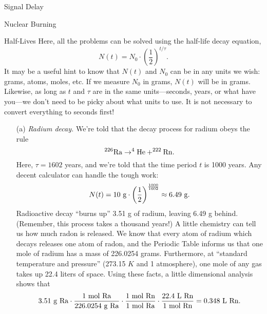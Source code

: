 \documentclass[12pt]{article}
\begin{document}
\begin{probdesc}{5}{Signal Delay}
\end{probdesc}

\begin{probdesc}{6}{Nuclear Burning}
\end{probdesc}

\begin{probdesc}{7}{Half-Lives}
Here, all the problems can be solved using the half-life decay equation,
\begin{equation}
N(t) = N_0 \cdot \left(\frac{1}{2}\right)^{t / \tau}.
\end{equation}
It may be a useful hint to know that $N(t)$ and $N_0$ can be in any
units we wish:  grams, atoms, moles, etc.  If we measure $N_0$ in
grams, $N(t)$ will be in grams.  Likewise, as long as $t$ and $\tau$
are in the same units---seconds, years, or what have you---we don't
need to be picky about what units to use.  It is not necessary to
convert everything to seconds first!

\begin{enumerate}
\item[(a)] {\em Radium decay.}  We're told that the decay process for
  radium obeys the rule
  \begin{equation}
    ^{226}{\rm Ra} \rightarrow ^4{\rm He} + ^{222}{\rm Rn}.
  \end{equation}
  Here, $\tau = 1602$ years, and we're told that the time period $t$
  is 1000 years.  Any decent calculator can handle the tough work:
\begin{equation}
N(t) = 10 {\rm\ g} \cdot \left(\frac{1}{2}\right)^{\frac{1000}{1602}}
  \approx 6.49 {\rm\ g}.
\end{equation}
Radioactive decay ``burns up'' 3.51 g of radium, leaving 6.49 g
behind.  (Remember, this process takes a thousand years!)  A little
chemistry can tell us how much radon is released.  We know that every
atom of radium which decays releases one atom of radon, and the
Periodic Table informs us that one mole of radium has a mass of
226.0254 grams.  Furthermore, at ``standard temperature and pressure''
(273.15 $K$ and 1 atmosphere), one mole of any gas takes up 22.4
liters of space.  Using these facts, a little dimensional analysis
shows that
\begin{equation}
3.51 {\rm\ g\ Ra} \cdot
\frac{1 \rm\ mol\ Ra}{226.0254 \rm\ g\ Ra} \cdot
\frac{1 \rm\ mol\ Rn}{1 \rm\ mol\ Ra} \cdot
\frac{22.4 \rm\ L\ Rn}{1 \rm\ mol\ Rn} = 0.348 \rm\ L\ Rn.
\end{equation}



\end{enumerate}
\end{probdesc}
\end{document}
